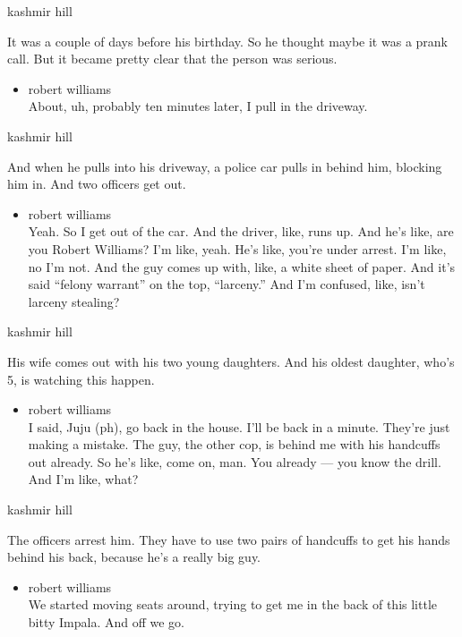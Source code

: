 kashmir hill

It was a couple of days before his birthday. So he thought maybe it was
a prank call. But it became pretty clear that the person was serious.

\begin{itemize}
\tightlist
\item
  robert williams\\
  About, uh, probably ten minutes later, I pull in the driveway.
\end{itemize}

kashmir hill

And when he pulls into his driveway, a police car pulls in behind him,
blocking him in. And two officers get out.

\begin{itemize}
\tightlist
\item
  robert williams\\
  Yeah. So I get out of the car. And the driver, like, runs up. And he's
  like, are you Robert Williams? I'm like, yeah. He's like, you're under
  arrest. I'm like, no I'm not. And the guy comes up with, like, a white
  sheet of paper. And it's said ``felony warrant'' on the top,
  ``larceny.'' And I'm confused, like, isn't larceny stealing?
\end{itemize}

kashmir hill

His wife comes out with his two young daughters. And his oldest
daughter, who's 5, is watching this happen.

\begin{itemize}
\tightlist
\item
  robert williams\\
  I said, Juju (ph), go back in the house. I'll be back in a minute.
  They're just making a mistake. The guy, the other cop, is behind me
  with his handcuffs out already. So he's like, come on, man. You
  already --- you know the drill. And I'm like, what?
\end{itemize}

kashmir hill

The officers arrest him. They have to use two pairs of handcuffs to get
his hands behind his back, because he's a really big guy.

\begin{itemize}
\tightlist
\item
  robert williams\\
  We started moving seats around, trying to get me in the back of this
  little bitty Impala. And off we go.
\end{itemize}

